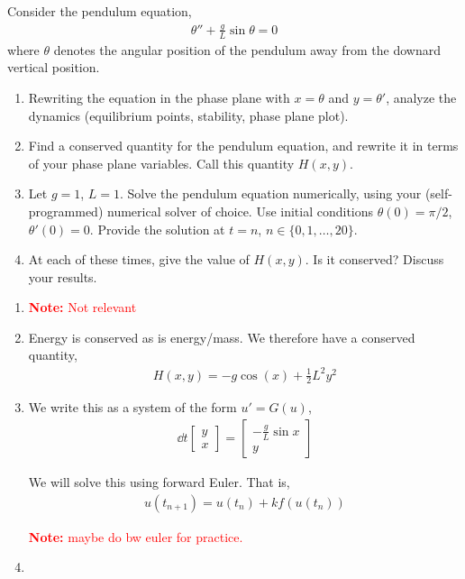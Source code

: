 \documentclass[10pt]{article}
\newcommand{\note}[1]{\textcolor{red}{\textbf{Note:} #1}}
\begin{document}
\begin{problem}
Consider the pendulum equation,
\begin{align*}
    \theta'' + \frac{g}{L}\sin \theta = 0
\end{align*}
where \( \theta \) denotes the angular position of the pendulum away from the downard vertical position.
    \begin{enumerate}[nolistsep,label=(\alph*)]
        \item Rewriting the equation in the phase plane with \( x=\theta \) and \( y=\theta' \), analyze the dynamics (equilibrium points, stability, phase plane plot).
        \item Find a conserved quantity for the pendulum equation, and rewrite it in terms of your phase plane variables. Call this quantity \( H(x,y) \).
        \item Let \( g=1 \), \( L=1 \). Solve the pendulum equation numerically, using your (self-programmed) numerical solver of choice. Use initial conditions \( \theta(0) = \pi/2 \), \( \theta'(0) = 0 \). Provide the solution at \( t=n \), \( n\in\{0,1,\ldots, 20\} \).
        \item At each of these times, give the value of \( H(x,y) \). Is it conserved? Discuss your results.
\end{enumerate}
\end{problem}

\begin{solution}[Solution]
\begin{enumerate}[label=(\alph*)]
    \item
        \note{Not relevant}
    \item
        Energy is conserved as is energy/mass. We therefore have a conserved quantity,
        \begin{align*}
            H(x,y) =  -g\cos(x) + \frac{1}{2}L^2 y^2
        \end{align*}
        
    \item We write this as a system of the form \( u' = G(u) \),
        \begin{align*}
            \dd{}{t} \left[\begin{array}{cc} y \\ x \end{array}\right]
            =
            \left[\begin{array}{c} - \frac{g}{L}\sin x \\ y \end{array}\right]
        \end{align*}
        
        We will solve this using forward Euler. That is,
        \begin{align*}
            u(t_{n+1}) = u(t_n) + k f(u(t_n))
        \end{align*}
        
        \note{maybe do bw euler for practice.}

    \item 
\end{enumerate}
 
\end{solution}
\end{document}
